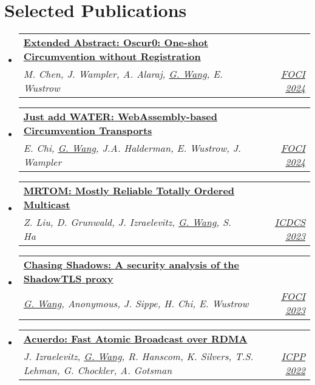 \documentclass[letterpaper,11pt]{article}
\makeatletter
\newcommand{\resumeSubheading}[4]{
  \vspace{-2pt}\item
    \begin{tabular*}{0.97\textwidth}[t]{l@{\extracolsep{\fill}}r}
      \textbf{#1} & #2 \\
      \textit{\small#3} & \textit{\small #4} \\
    \end{tabular*}\vspace{-7pt}
}
\newcommand{\resumeSubHeadingListStart}{\begin{itemize}[leftmargin=0.15in, label={}]}
\newcommand{\resumeSubHeadingListEnd}{\end{itemize}}
\makeatother
\begin{document}
\section{Selected Publications}
\resumeSubHeadingListStart
  \resumeSubheading
  {\href{https://www.petsymposium.org/foci/2024/foci-2024-0005.php}{\textbf{Extended Abstract: Oscur0: One-shot Circumvention without Registration}}}{}
  {M. Chen, J. Wampler, A. Alaraj, \underline{G. Wang}, E. Wustrow}{\href{https://foci.community/foci24.html}{FOCI 2024}}
  \resumeSubheading
  {\href{https://www.petsymposium.org/foci/2024/foci-2024-0003.php}{\textbf{Just add {WATER}: {WebAssembly}-based Circumvention Transports}}}{}
  {E. Chi, \underline{G. Wang}, J.A. Halderman, E. Wustrow, J. Wampler}{\href{https://foci.community/foci24.html}{FOCI 2024}}
  \resumeSubheading
  {\href{https://ieeexplore.ieee.org/document/10272412}{\textbf{{MRTOM}: Mostly Reliable Totally Ordered Multicast}}}{}
  {Z. Liu, D. Grunwald, J. Izraelevitz, \underline{G. Wang}, S. Ha}{\href{https://icdcs2023.icdcs.org/}{ICDCS 2023}}
  \resumeSubheading
  {\href{https://www.petsymposium.org/foci/2023/foci-2023-0002.php}{\textbf{{Chasing Shadows}: A security analysis of the {ShadowTLS} proxy}}}{}
  {\underline{G. Wang}, Anonymous, J. Sippe, H. Chi, E. Wustrow}{\href{https://foci.community/foci23.html}{FOCI 2023}}
  \resumeSubheading
  {\href{https://dl.acm.org/doi/abs/10.1145/3545008.3545041}{\textbf{Acuerdo: Fast Atomic Broadcast over {RDMA}}}}{}
  {J. Izraelevitz, \underline{G. Wang}, R. Hanscom, K. Silvers, T.S. Lehman, G. Chockler, A. Gotsman}{\href{https://icpp22.gitlabpages.inria.fr/}{ICPP 2022}}
\resumeSubHeadingListEnd
\vspace{1pt}

\end{document}
